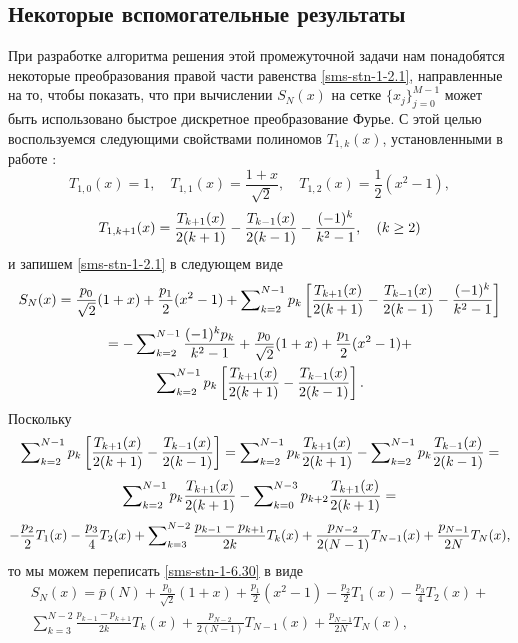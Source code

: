 \subsection{Некоторые вспомогательные результаты}

При разработке алгоритма решения этой промежуточной задачи нам понадобятся некоторые преобразования правой части равенства \eqref{sms-stn-1-2.1},
направленные на то, чтобы показать, что при вычислении $S_N(x)$ на сетке %
$\{x_j\}_{j=0}^{M-1}$ может быть использовано
быстрое дискретное преобразование Фурье. С этой целью воспользуемся следующими свойствами полиномов $T_{1,k}(x)$, установленными в работе \cite{sms-stn-1-SharIzVuz}:
\begin{equation}\label{sms-stn-1-sobcheb5}
T_{1,0}(x)=1, \quad T_{1,1}(x)=\frac{1+x}{\sqrt{2}}, \quad T_{1,2}(x)=\frac12(x^2-1),
\end{equation}
\begin{equation}\label{sms-stn-1-sobcheb6}
T_{1,k+1}(x)={T_{k+1}(x)\over2(k+1)}- {T_{k-1}(x)\over2(k-1)} -\frac{(-1)^k}{k^2-1},\quad (k\ge 2)
\end{equation}
и запишем  \eqref{sms-stn-1-2.1} в следующем виде
$$
S_N(x)=\frac{p_0}{\sqrt{2}}(1+x)+\frac{p_1}2(x^2-1)+ \sum\nolimits_{k=2}^{N-1}p_k\left[{T_{k+1}(x)\over2(k+1)}- {T_{k-1}(x)\over2(k-1)} -\frac{(-1)^k}{k^2-1}\right]
$$
\begin{multline}\label{sms-stn-1-6.30}
=-\sum\nolimits_{k=2}^{N-1} \frac{(-1)^kp_k}{k^2-1}+\frac{p_0}{\sqrt{2}}(1+x)+\frac{p_1}2(x^2-1)+
\\
\sum\nolimits_{k=2}^{N-1}p_k\left[{T_{k+1}(x)\over2(k+1)}- {T_{k-1}(x)\over2(k-1)}\right].
\end{multline}
Поскольку
$$
\sum\nolimits_{k=2}^{N-1}p_k\left[{T_{k+1}(x)\over2(k+1)}- {T_{k-1}(x)\over2(k-1)} \right]=
\sum\nolimits_{k=2}^{N-1}p_k{T_{k+1}(x)\over2(k+1)}-\sum\nolimits_{k=2}^{N-1}p_k{T_{k-1}(x)\over2(k-1)}=
$$
$$
\sum\nolimits_{k=2}^{N-1}p_k{T_{k+1}(x)\over2(k+1)}-\sum\nolimits_{k=0}^{N-3}p_{k+2}{T_{k+1}(x)\over2(k+1)}=
$$
$$
-{p_{2}\over2}T_{1}(x)-{p_{3}\over4}T_{2}(x)+\sum\nolimits_{k=3}^{N-2}{p_{k-1}-p_{k+1}\over2k}T_k(x)
+{p_{N-2}\over2(N-1)}T_{N-1}(x)+{p_{N-1}\over2N}T_{N}(x),
$$
то   мы можем переписать \eqref{sms-stn-1-6.30} в виде
\begin{multline}\label{sms-stn-1-6.31}
S_N(x)=
\bar p(N)+\frac{p_0}{\sqrt{2}}(1+x)+\frac{p_1}2(x^2-1)-\frac{p_{2}}{2}T_{1}(x)-\frac{p_{3}}{4}T_{2}(x)+
\\
\sum\nolimits_{k=3}^{N-2}\frac{p_{k-1}-p_{k+1}}{2k}T_k(x)
+\frac{p_{N-2}}{2(N-1)}T_{N-1}(x)+\frac{p_{N-1}}{2N}T_{N}(x),
\end{multline}
